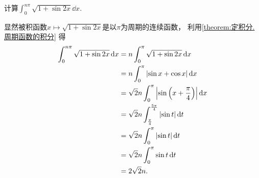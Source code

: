 \begin{example}
计算\(\int_0^{n\pi} \sqrt{1 + \sin2x} \dd{x}\).
\begin{solution}
显然被积函数\(x \mapsto \sqrt{1 + \sin2x}\)是以\(\pi\)为周期的连续函数，
利用\cref{theorem:定积分.周期函数的积分} 得\begin{align*}
	\int_0^{n\pi} \sqrt{1 + \sin2x} \dd{x}
	&= n \int_0^\pi \sqrt{1 + \sin2x} \dd{x} \\
	&= n \int_0^\pi \abs{\sin x + \cos x} \dd{x} \\
	&= \sqrt2 n \int_0^\pi \abs{\sin\left(x + \frac\pi4\right)} \dd{x} \\
	&= \sqrt2 n \int_{\frac\pi4}^{\frac{5\pi}4} \abs{\sin t} \dd{t} \\
	&= \sqrt2 n \int_0^\pi \abs{\sin t} \dd{t} \\
	&= \sqrt2 n \int_0^\pi \sin t \dd{t} \\
	&= 2\sqrt2 n.
\end{align*}
\end{solution}
\end{example}

